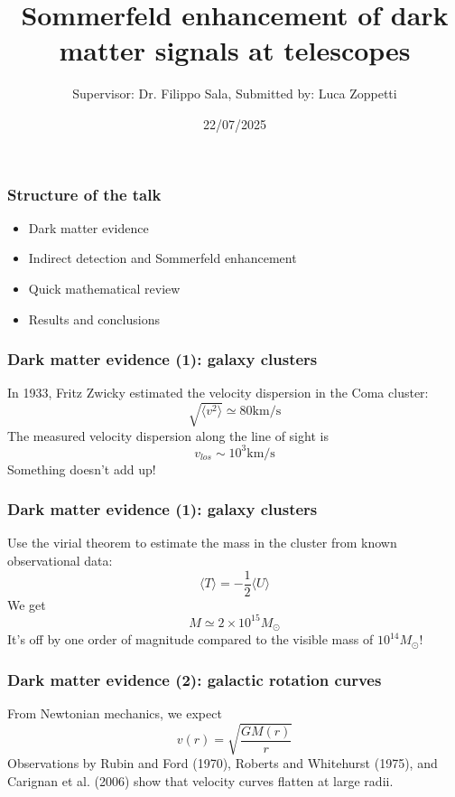 \documentclass{beamer}
\title{Sommerfeld enhancement of dark matter signals at telescopes}
\author{Supervisor: Dr. Filippo Sala, Submitted by: Luca Zoppetti}
\institute{Alma Mater Studiorum - University of Bologna}
\date{22/07/2025}
\begin{document}
\frame{\titlepage}

\begin{frame}
\frametitle{Structure of the talk}
\begin{itemize}
	\item Dark matter evidence
	\item Indirect detection and Sommerfeld enhancement
	\item Quick mathematical review
	\item Results and conclusions
\end{itemize}
\end{frame}

\begin{frame}
\frametitle{Dark matter evidence (1): galaxy clusters}
In 1933, Fritz Zwicky estimated the velocity dispersion in the Coma cluster:
\[
	\sqrt{\langle v^2 \rangle } \simeq 80 \mathrm{km / s}
\]
\pause
The measured velocity dispersion along the line of sight is
\[
	v_{los} \sim 10^3 \mathrm{km / s} 
\]
\pause
Something doesn't add up!
\end{frame}

\begin{frame}
\frametitle{Dark matter evidence (1): galaxy clusters}
Use the virial theorem to estimate the mass in the cluster from known observational data:
\[
	\langle T \rangle = - \frac{1}{2} \langle U \rangle 
\]
\pause
We get
\[
	M \simeq 2 \times 10^{15} M_\odot
\]
\pause
It's off by one order of magnitude compared to the visible mass of \(10^{14} M_\odot\)!
\end{frame}

\begin{frame}
\frametitle{Dark matter evidence (2): galactic rotation curves}
From Newtonian mechanics, we expect
\[
	v(r) = \sqrt{\frac{GM(r)}{r}} 
\]
\pause
Observations by Rubin and Ford (1970), Roberts and Whitehurst (1975), and Carignan et al. (2006) show that velocity curves flatten at large radii.
\end{frame}
\end{document}
